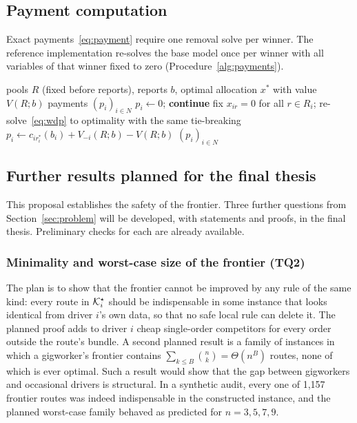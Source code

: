 \subsection{Payment computation}
\label{sec:sd-payments}

Exact payments~\eqref{eq:payment} require one removal solve per winner.
The reference implementation re-solves the base model once per winner with
all variables of that winner fixed to zero (Procedure~\ref{alg:payments}).

\begin{algorithm}[!htbp]
\caption{\textsc{Payments}$(R,b,x^\ast)$: exact Clarke-pivot payments (Algorithm C)}
\label{alg:payments}
\begin{algorithmic}[1]
\Require pools $R$ (fixed before reports), reports $b$, optimal allocation $x^\ast$ with value $V(R;b)$
\Ensure payments $(p_i)_{i\in N}$
   $p_i\gets 0$; \textbf{continue} \EndIf
  \State fix $x_{ir}=0$ for all $r\in R_i$; re-solve~\eqref{eq:wdp} to optimality with the same tie-breaking
  \State $p_i\gets c_{ir_i^\ast}(b_i)+V_{-i}(R;b)-V(R;b)$
\EndFor
\State \Return $(p_i)_{i\in N}$
\end{algorithmic}
\end{algorithm}

\subsection{Further results planned for the final thesis}
\label{sec:sd-planned}

This proposal establishes the safety of the frontier. Three further
questions from Section~\ref{sec:problem} will be developed, with statements
and proofs, in the final thesis. Preliminary checks for each are already
available.

\subsubsection{Minimality and worst-case size of the frontier (TQ2)}
\label{sec:sd-pol}

The plan is to show that the frontier cannot be improved by any rule of the
same kind: every route in $\mathcal{K}^\star_i$ should be indispensable in some instance
that looks identical from driver $i$'s own data, so that no safe local rule
can delete it. The planned proof adds to driver $i$ cheap single-order
competitors for every order outside the route's bundle. A second planned
result is a family of instances in which a gigworker's frontier contains
$\sum_{k\le B}\binom nk=\Theta(n^B)$ routes, none of which is ever optimal.
Such a result would show that the gap between gigworkers and occasional
drivers is structural. In a synthetic audit, every one of 1,157 frontier
routes was indeed indispensable in the constructed instance, and the planned
worst-case family behaved as predicted for $n=3,5,7,9$.

